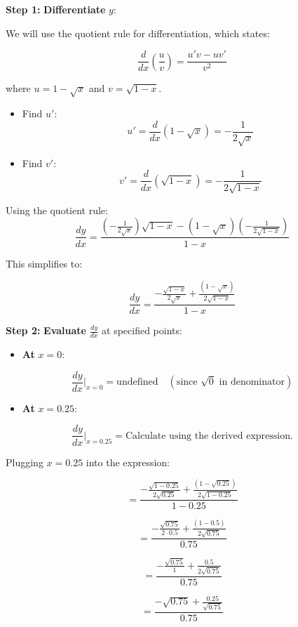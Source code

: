 \documentclass[
]{book}
\providecommand{\tightlist}{%
  \setlength{\itemsep}{0pt}\setlength{\parskip}{0pt}}
\theoremstyle{definition}
\theoremstyle{definition}
\theoremstyle{definition}
\theoremstyle{definition}
\theoremstyle{remark}
\begin{document}
\textbf{Step 1:} \textbf{Differentiate} \(y\):

We will use the quotient rule for differentiation, which states:

\[
\frac{d}{dx}\left(\frac{u}{v}\right) = \frac{u'v - uv'}{v^2}
\]

where \(u = 1 - \sqrt{x}\) and \(v = \sqrt{1 - x}\).

\begin{itemize}
\item
  Find \(u'\): \[
  u' = \frac{d}{dx}(1 - \sqrt{x}) = -\frac{1}{2\sqrt{x}}
  \]
\item
  Find \(v'\): \[
  v' = \frac{d}{dx}(\sqrt{1 - x}) = -\frac{1}{2\sqrt{1 - x}}
  \]
\end{itemize}

Using the quotient rule: \[
\frac{dy}{dx} = \frac{\left(-\frac{1}{2\sqrt{x}}\right) \sqrt{1 - x} - (1 - \sqrt{x}) \left(-\frac{1}{2\sqrt{1 - x}}\right)}{1 - x}
\]

This simplifies to:

\[
\frac{dy}{dx} = \frac{-\frac{\sqrt{1 - x}}{2\sqrt{x}} + \frac{(1 - \sqrt{x})}{2\sqrt{1 - x}}}{1 - x}
\]

\textbf{Step 2:} \textbf{Evaluate} \(\frac{dy}{dx}\) at specified points:

\begin{itemize}
\tightlist
\item
  \textbf{At} \(x = 0\):
\end{itemize}

\[
    \frac{dy}{dx}\bigg|_{x=0} = \text{undefined} \quad (\text{since } \sqrt{0} \text{ in denominator})
\]

\begin{itemize}
\tightlist
\item
  \textbf{At} \(x = 0.25\):
\end{itemize}

\[
    \frac{dy}{dx}\bigg|_{x=0.25} = \text{Calculate using the derived expression.}
\]

Plugging \(x = 0.25\) into the expression:

\[
    = \frac{-\frac{\sqrt{1 - 0.25}}{2\sqrt{0.25}} + \frac{(1 - \sqrt{0.25})}{2\sqrt{1 - 0.25}}}{1 - 0.25}
\]

\[
    = \frac{-\frac{\sqrt{0.75}}{2 \cdot 0.5} + \frac{(1 - 0.5)}{2\sqrt{0.75}}}{0.75}
\]

\[
    = \frac{-\frac{\sqrt{0.75}}{1} + \frac{0.5}{2\sqrt{0.75}}}{0.75}
\]

\[
    = \frac{-\sqrt{0.75} + \frac{0.25}{\sqrt{0.75}}}{0.75}
\]
\end{document}
